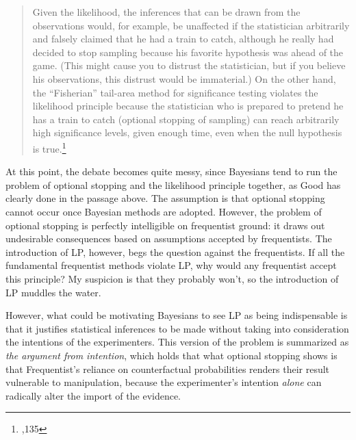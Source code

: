 \begin{quote}
Given the likelihood, the inferences that can be drawn from the
observations would, for example, be unaffected if the statistician
arbitrarily and falsely claimed that he had a train to catch, although
he really had decided to stop sampling because his favorite hypothesis
was ahead of the game. (This might cause you to distrust the
statistician, but if you believe his observations, this distrust would
be immaterial.) On the other hand, the ``Fisherian'' tail-area method
for significance testing violates the likelihood principle because the
statistician who is prepared to pretend he has a train to catch
(optional stopping of sampling) can reach arbitrarily high significance
levels, given enough time, even when the null hypothesis is true.\footnote{\cite{goodthinking},135}
\end{quote}






At this point, the debate becomes quite messy, since Bayesians tend to
run the problem of optional stopping and the likelihood principle
together, as Good has clearly done in the passage above. The assumption
is that optional stopping cannot occur once Bayesian methods are
adopted. However, the problem of optional stopping is perfectly
intelligible on frequentist ground: it draws out undesirable
consequences based on assumptions accepted by frequentists. The
introduction of LP, however, begs the question against the frequentists.
If all the fundamental frequentist methods violate LP, why would any
frequentist accept this principle? My suspicion is that they probably
won't, so the introduction of LP muddles the water. 

However, what could be motivating Bayesians to see LP as being indispensable
is that it justifies statistical inferences to be made without taking into consideration the intentions of the experimenters. This version of the problem is
summarized as \emph{the argument from intention}, which holds that what
optional stopping shows is that Frequentist's reliance on counterfactual
probabilities renders their result vulnerable to manipulation, because
the experimenter's intention \emph{alone} can radically alter the import
of the evidence.

